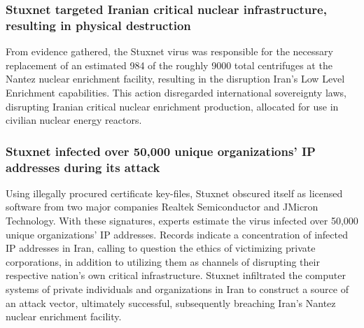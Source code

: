 \documentclass[12pt]{article}
\begin{document}
\begin{multicols}{2}
\subsubsection{Stuxnet targeted Iranian critical nuclear infrastructure, resulting in physical destruction}

From evidence gathered, the Stuxnet virus was responsible for the necessary replacement of an estimated 984 of the roughly 9000 total centrifuges at the Nantez nuclear enrichment facility, resulting in the disruption Iran's Low Level Enrichment capabilities.\cite{lookIntoIranianNuclearProgram} This action disregarded international sovereignty laws, disrupting Iranian critical nuclear enrichment production, allocated for use in civilian nuclear energy reactors.\cite{internationalSovereigntyDefinition}\footnotemark[2] 


\subsubsection{Stuxnet infected over 50,000 unique organizations' IP addresses during its attack}

Using illegally procured certificate key-files, Stuxnet obscured itself as licensed software from two major companies Realtek Semiconductor and JMicron Technology. With these signatures, experts estimate the virus infected over 50,000 unique organizations' IP addresses.\cite{lessonsFromStuxnet} Records indicate a concentration of infected IP addresses in Iran, calling to question the ethics of victimizing private corporations, in addition to  utilizing them as channels of disrupting their respective nation's own critical infrastructure. Stuxnet infiltrated the computer systems of private individuals and organizations in Iran to construct a source of an attack vector, ultimately successful, subsequently breaching Iran's Nantez nuclear enrichment facility.\cite{w32.stuxnetDossier} 


\end{multicols}
\end{document}
